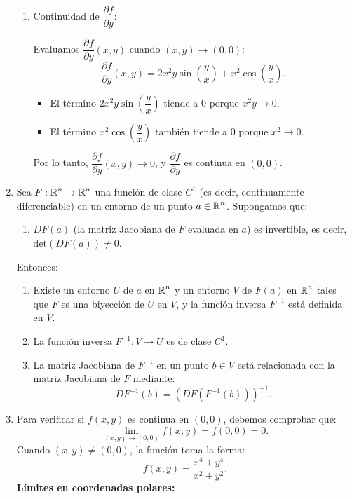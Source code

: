 \begin{enumerate}[label=\color{red}\textbf{\arabic*)}, leftmargin=*]
\begin{enumerate}[label=\arabic*)]
\item Continuidad de $\dfrac{\partial f}{\partial y}$:

Evaluamos $\dfrac{\partial f}{\partial y}(x,y)$ cuando $(x,y)\to(0,0)$: $$\dfrac{\partial f}{\partial y}(x,y)=2x^2y\sin\left(\dfrac{y}{x}\right)+x^2\cos\left(\dfrac{y}{x}\right).$$
\begin{itemize}
\item El término $2x^2y\sin\left(\dfrac{y}{x}\right)$ tiende a $0$ porque $x^2y\to0$.
\item El término $x^2\cos\left(\dfrac{y}{x}\right)$ también tiende a $0$ porque $x^2\to0$.
\end{itemize}
Por lo tanto, $\dfrac{\partial f}{\partial y}(x,y)\to0$, y $\dfrac{\partial f}{\partial y}$ es continua en $(0,0)$.
\end{enumerate}

\item {}

Sea $F:\operatorname{\mathbb{R}}^n\to\operatorname{\mathbb{R}}^n$ una función de clase $C^1$ (es decir, continuamente diferenciable) en un entorno de un punto $a\in\operatorname{\mathbb{R}}^n$. Supongamos que:

\begin{enumerate}[label=\arabic*)]
\item $DF(a)$ (la matriz Jacobiana de $F$ evaluada en $a$) es invertible, es decir, $\mathrm{det}(DF(a))\neq0$.
\end{enumerate}
Entonces:
\begin{enumerate}[label=\arabic*)]
\item Existe un entorno $U$ de $a$ en $\operatorname{\mathbb{R}}^n$ y un entorno $V$ de $F(a)$ en $\operatorname{\mathbb{R}}^n$ tales que $F$ es una biyección de $U$ en $V$, y la función inversa $F^{-1}$ está definida en $V$.
\item La función inversa $F^{-1}:V\to U$ es de clase $C^1$.
\item La matriz Jacobiana de $F^{-1}$ en un punto $b\in V$ está relacionada con la matriz Jacobiana de $F$ mediante: $$DF^{-1}(b)=(DF(F^{-1}(b)))^{-1}.$$
\end{enumerate}
\item {}

Para verificar si $f(x,y)$ es continua en $(0,0)$, debemos comprobar que: $$\lim_{ (x,y) \to (0,0) }f(x,y)=f(0,0)=0.$$
Cuando $(x,y)\neq (0,0)$, la función toma la forma: $$f(x,y)=\dfrac{x^4+y^4}{x^{2}+y^{2}}.$$
\textbf{Límites en coordenadas polares:}


\end{enumerate}
